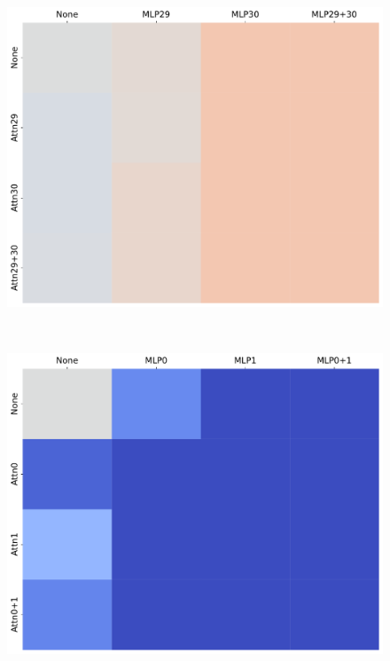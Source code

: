 \begin{figure}[t]
\begin{minipage}{0.24\textwidth}
      \includegraphics[width=\linewidth]{Figures/figures_circuit/interventions/bos_upper.pdf}
  \end{minipage}~
  \begin{minipage}{0.24\textwidth}
      \centering
      \label{fig:appendix-ablation-delim-lower}
      \vspace{-.2em}
      \includegraphics[width=\linewidth]{Figures/figures_circuit/interventions/delim_lower.pdf}
  \end{minipage}~

\end{figure}
